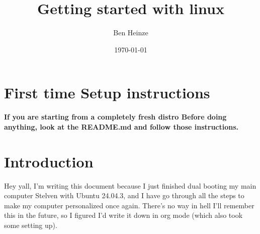 \documentclass[11pt]{article}
\author{Ben Heinze}
\date{\today}
\title{Getting started with linux}
\begin{document}
\maketitle
\tableofcontents



\section{First time Setup instructions}
\label{sec:orgfa41d46}

\textbf{\textbf{If you are starting from a completely fresh distro Before doing anything, look at the README.md and follow those instructions.}}

\section{Introduction}
\label{sec:org03157e4}

Hey yall, I'm writing this document because I just finished dual booting my main computer Stelven with Ubuntu 24.04.3, and I have go through all the steps to make my computer personalized once again. There's no way in hell I'll remember this in the future, so I figured I'd write it down in org mode (which also took some setting up).
\end{document}
